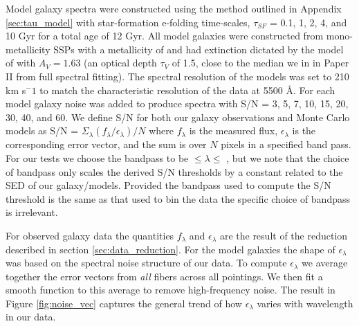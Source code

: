 Model galaxy spectra were constructed using the method outlined in
Appendix \ref{sec:tau_model} with star-formation e-folding
time-scales, $\tau_{SF}$ = 0.1, 1, 2, 4, and 10 Gyr for a total age of
12 Gyr.  All model galaxies were constructed from mono-metallicity
SSPs with a metallicity of  and had extinction
dictated by the model of \citet{Charlot00} with $A_V=1.63$ (an optical
depth $\tau_V$ of 1.5, close to the median we in in Paper II from full
spectral fitting). The spectral resolution of the models was set to
210 km s${^-1}$ to match the characteristic resolution of the data at
5500 \AA. For each model galaxy noise was added to produce spectra
with S/N = 3, 5, 7, 10, 15, 20, 30, 40, and 60. We define S/N for both
our galaxy observations and Monte Carlo models as S/N =
$\Sigma_{\lambda}\left(f_\lambda/\epsilon_\lambda\right)/N$ where
$f_\lambda$ is the measured flux, $\epsilon_\lambda$ is the
corresponding error vector, and the sum is over $N$ pixels in a
specified band pass. For our tests we choose the bandpass to be
 $\leq \lambda \leq$ , but we note that
the choice of bandpass only scales the derived S/N thresholds by a
constant related to the SED of our galaxy/models. Provided the
bandpass used to compute the S/N threshold is the same as that used to
bin the data the specific choice of bandpass is irrelevant.

For observed galaxy data the quantities $f_\lambda$ and
$\epsilon_\lambda$ are the result of the reduction described in
section \ref{sec:data_reduction}. For the model galaxies the shape of
$\epsilon_\lambda$ was based on the spectral noise structure of our
data.  To compute $\epsilon_\lambda$ we average together the error
vectors from \emph{all} fibers across all pointings. We then fit a
smooth function to this average to remove high-frequency noise. The
result in Figure \ref{fig:noise_vec} captures the general trend of how
$\epsilon_\lambda$ varies with wavelength in our data.




